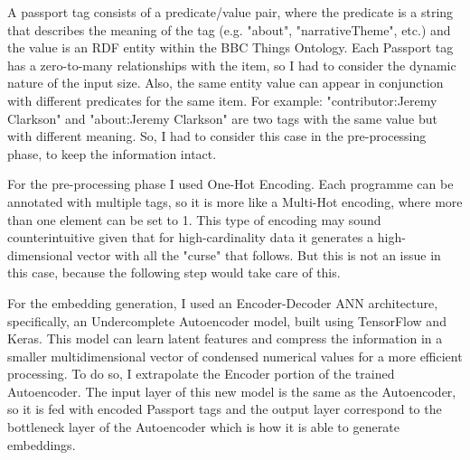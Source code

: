 A passport tag consists of a predicate/value pair, where the predicate is a string that describes the meaning of the tag (e.g. "about", "narrativeTheme",  etc.) and the value is an RDF entity within the BBC Things Ontology. Each Passport tag has a zero-to-many relationships with the item, so I had to consider the dynamic nature of the input size. Also, the same entity value can appear in conjunction with different predicates for the same item. For example: "contributor:Jeremy Clarkson" and "about:Jeremy Clarkson" are two tags with the same value but with different meaning. So, I had to consider this case in the pre-processing phase, to keep the information intact.

For the pre-processing phase I used One-Hot Encoding. Each programme can be annotated with multiple tags, so it is more like a Multi-Hot encoding, where more than one element can be set to 1. This type of encoding may sound counterintuitive given that for high-cardinality data it generates a high-dimensional vector with all the "curse" that follows. But this is not an issue in this case, because the following step would take care of this.

For the embedding generation, I used an Encoder-Decoder ANN architecture, specifically, an Undercomplete Autoencoder model, built using TensorFlow and Keras. This model can learn latent features and compress the information in a smaller multidimensional vector of condensed numerical values for a more efficient processing. To do so, I extrapolate the Encoder portion of the trained Autoencoder. The input layer of this new model is the same as the Autoencoder, so it is fed with encoded Passport tags and the output layer correspond to the bottleneck layer of the Autoencoder which is how it is able to generate embeddings.
